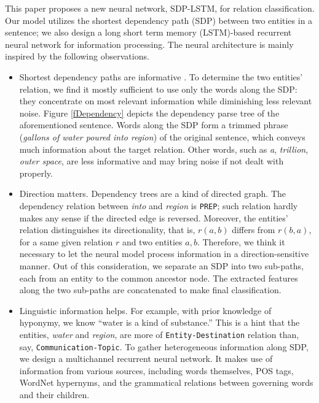 \documentclass[11pt,a4paper]{article}
\begin{document}
This paper proposes a new neural network, SDP-LSTM, for relation classification.
Our model utilizes the shortest dependency path (SDP) between two entities in a sentence;
we also design a long short term memory (LSTM)-based recurrent neural network for
information processing.
The neural architecture is mainly inspired by the following observations.
\begin{itemize}
\item Shortest dependency paths are informative \cite{relex,deriving}. To determine the two entities' relation,
we find it mostly sufficient
to use only the words along the SDP: they concentrate on most relevant information while diminishing less relevant noise.
Figure \ref{fDependency} depicts the dependency parse tree of the aforementioned sentence.
Words along the SDP form a trimmed phrase (\textit{gallons of water poured into region}) of the original sentence,
which conveys much information about the target relation.
Other words, such as \textit{a}, \textit{trillion}, \textit{outer space},
are less informative and may bring noise if not dealt with properly.

\item Direction matters. Dependency trees are a kind of directed graph. The dependency relation between \textit{into} and \textit{region} is \verb|PREP|; such relation hardly makes any sense if the directed edge is reversed.
Moreover, the entities' relation distinguishes its directionality, that is,
$r(a,b)$ differs from $r(b,a)$, for a same given relation $r$ and two entities $a, b$.
Therefore, we think it necessary to let the neural model
process information in a direction-sensitive manner.
Out of this consideration, we separate an SDP into two sub-paths,
each from an entity to the common ancestor node.
The extracted features along the two sub-paths are concatenated
to make final classification.

\item Linguistic information helps.
For example, with prior knowledge of hyponymy, we know ``water is a kind of substance.''
This is a hint that the entities, \textit{water} and \textit{region},  are more of
\verb|Entity-Destination| relation than, say, \verb|Communication-Topic|.
To gather heterogeneous information along SDP, we design a multichannel recurrent neural network.
It makes use of information from various sources, including words themselves, POS tags, WordNet hypernyms,
and the grammatical relations between governing words
and their children. \end{itemize}
\end{document}
